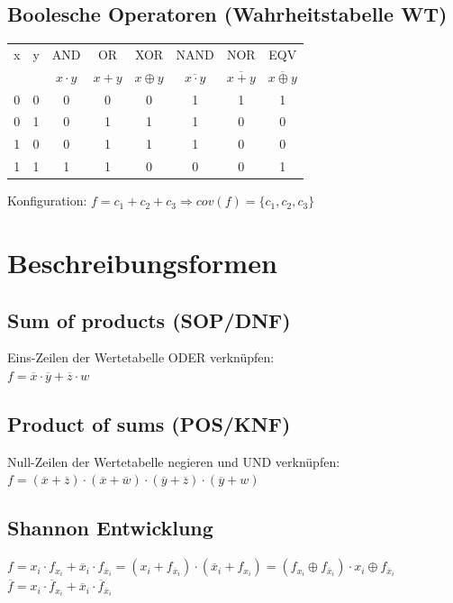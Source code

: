 \documentclass[6pt,a4paper]{scrartcl}
\newcommand{\eset}[1]{\ensuremath{\bigl\{#1\bigr\}}}								%
\newcommand{\ol}[1]{\ensuremath{\overline{#1}}}									%
\newcommand{\Ra}[0]{\ensuremath{\Rightarrow}}									%
\begin{document}
\begin{multicols}{3}
	\subsection{Boolesche Operatoren (Wahrheitstabelle WT)}
	\begin{tabular}{c|c||c|c|c|c|c|c}
		x & y & AND & OR & XOR & NAND & NOR & EQV \\ 
		& & $x\cdot y$ & $x+y$ & $x\oplus y$ & $\overline{x\cdot y}$ & $\overline{x+y}$ & $\overline{x\oplus y}$ \\ \hline \hline
		0 & 0 & 0 & 0 & 0 & 1 & 1 & 1  \\ \hline
		0 & 1 & 0 & 1 & 1 & 1 & 0 & 0 \\ \hline
		1 & 0 & 0 & 1 & 1 & 1 & 0 & 0 \\ \hline
		1 & 1 & 1 & 1 & 0 & 0 & 0 & 1 \\
	\end{tabular}

Konfiguration: $f = c_1 + c_2 + c_3 \Ra cov(f) = \eset{c_1, c_2, c_3}$



\section{Beschreibungsformen}

\subsection{Sum of products (SOP/DNF)}
Eins-Zeilen der Wertetabelle ODER verknüpfen: \\
$f = \overline x \cdot \overline y + \overline z \cdot w$

\subsection{Product of sums (POS/KNF)}
Null-Zeilen der Wertetabelle negieren und UND verknüpfen: \\	
$f = ( \ol x + \ol z) \cdot ( \ol x + \ol w) \cdot ( \ol y + \ol z) \cdot ( \ol y + w)$ 

\subsection{Shannon Entwicklung}
	$f = x_i \cdot f_{x_i} + \ol x_i \cdot f_{\ol x_i} = (x_i + f_{\ol x_i})\cdot ( \ol x_i + f_{x_i}) = (f_{x_i} \oplus f_{\ol x_i}) \cdot x_i \oplus f_{\ol x_i}$ \\
	$\ol f = x_i \cdot \ol f_{x_i} + \ol x_i \cdot \ol f_{\ol x_i}$

\end{multicols}
\end{document}
